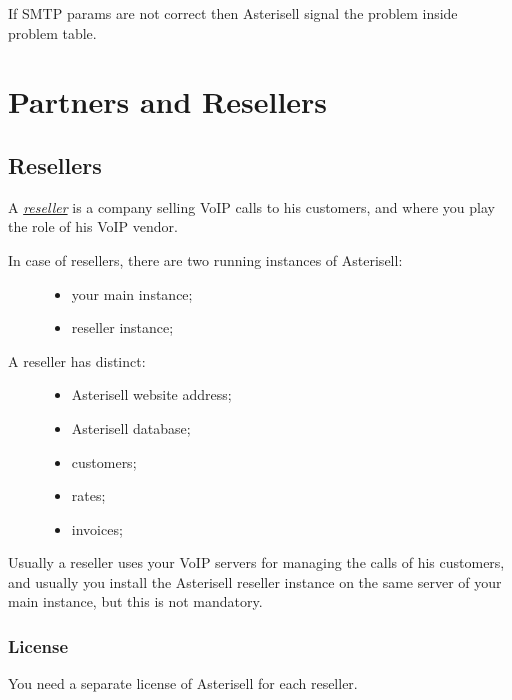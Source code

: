 \documentclass[letterpaper,10pt,english]{sphinxmanual}
\begin{document}
If SMTP params are not correct then Asterisell signal the problem inside problem table.


\chapter{Partners and Resellers}
\label{index:partners-and-resellers}

\section{Resellers}
\label{index:resellers}\label{index:id4}
A {\hyperref[index:term-reseller]{\emph{reseller}}} is a company selling VoIP calls to his customers, and where you play the role of his VoIP vendor.
\begin{description}
\item[{In case of resellers, there are two running instances of Asterisell:}] \leavevmode\begin{itemize}
\item {} 
your main instance;

\item {} 
reseller instance;

\end{itemize}

\item[{A reseller has distinct:}] \leavevmode\begin{itemize}
\item {} 
Asterisell website address;

\item {} 
Asterisell database;

\item {} 
customers;

\item {} 
rates;

\item {} 
invoices;

\end{itemize}

\end{description}

Usually a reseller uses your VoIP servers for managing the calls of his customers, and usually you install the Asterisell reseller instance on the same server of your main instance, but this is not mandatory.


\subsection{License}
\label{index:license}
You need a separate license of Asterisell for each reseller.
\end{document}
